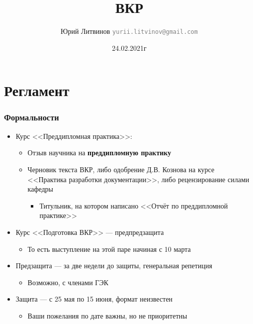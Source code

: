 \documentclass[xetex,mathserif,serif]{beamer}
\title{ВКР}
\author[Юрий Литвинов]{Юрий Литвинов \newline \textcolor{gray}{\small\texttt{yurii.litvinov@gmail.com}}}
\date{24.02.2021г}
\begin{document}
    \frame{\titlepage}

    \section{Регламент}

    \begin{frame}
        \frametitle{Формальности}
        \begin{itemize}
            \item Курс <<Преддипломная практика>>:
            \begin{itemize}
                \item Отзыв научника на \textbf{преддипломную практику}
                \item Черновик текста ВКР, либо одобрение Д.В. Кознова на курсе <<Практика разработки документации>>, либо рецензирование силами кафедры
                \begin{itemize}
                    \item Титульник, на котором написано <<Отчёт по преддипломной практике>>
                \end{itemize}
            \end{itemize}
            \item Курс <<Подготовка ВКР>> --- предпредзащита
            \begin{itemize}
                \item То есть выступление на этой паре начиная с 10 марта
            \end{itemize}
            \item Предзащита --- за две недели до защиты, генеральная репетиция
            \begin{itemize}
                \item Возможно, с членами ГЭК
            \end{itemize}
            \item Защита --- с 25 мая по 15 июня, формат неизвестен
            \begin{itemize}
                \item Ваши пожелания по дате важны, но не приоритетны
            \end{itemize}
        \end{itemize}
    \end{frame}
\end{document}
